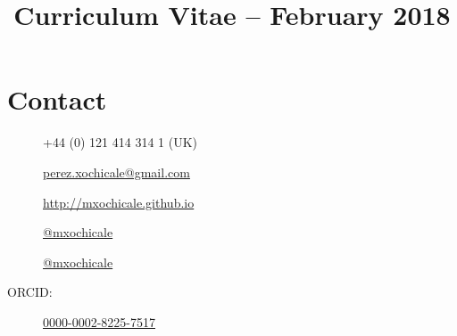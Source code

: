 \documentclass[10pt,a4paper,roman]{moderncv}
\title{Curriculum Vitae -- February 2018}
\begin{document}
%
%
\makecvtitle



%


\vspace{-15mm}


\section{Contact}
%

\begin{changemargin}{2.4cm}{0.5cm}
  \begin{minipage}{.4\textwidth}
    \begin{description}
     \item [\faPhone ]    +44 (0) 121 414 314 1 (UK)
     \item[\faEnvelope]  \href{mailto:perez.xochicale@gmail.com}{perez.xochicale@gmail.com}
     \item[\faHome]  \href{http://mxochicale.github.io}{http://mxochicale.github.io}
     \end{description}
  \end{minipage}
  \begin{minipage}{.4\textwidth}
  \begin{description}
   \item[\faTwitter ] \href{https://twitter.com/_mxochicale}{@\textunderscore mxochicale}
   \item[\faGithub]  \href{https://github.com/mxochicale}{@mxochicale}
   \item[ORCID:] \href{http://orcid.org/0000-0002-8225-7517}{0000-0002-8225-7517}
   \end{description}
  \end{minipage}
\end{changemargin}
\end{document}
